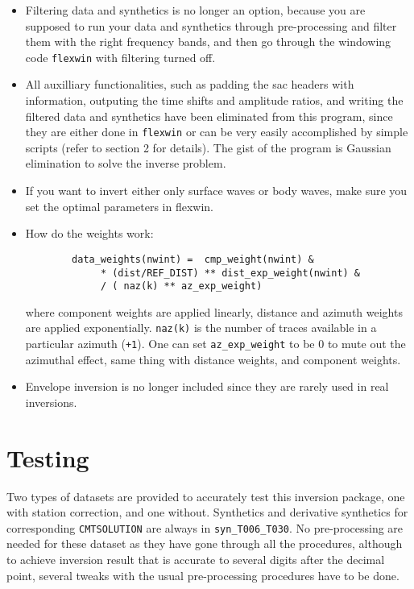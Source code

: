 \documentclass[12pt,titlepage,fleqn]{article}
\begin{document}
\begin{itemize}
\item  Filtering data and synthetics is no longer an option, because you are supposed to run your data and synthetics through pre-processing  and filter them with the right frequency bands, and then go through the windowing code \verb=flexwin= with filtering turned off.

\item All auxilliary functionalities, such as padding the sac headers with information, outputing the time shifts and amplitude ratios, and writing the filtered data and synthetics have been eliminated from this program, since they are either done in \verb=flexwin= or can be very easily accomplished by simple scripts (refer to section 2 for details). The gist of the program is Gaussian elimination to solve the inverse problem.

\item If you want to invert either only surface waves or body waves, make sure you set the optimal parameters in flexwin.

\item How do the weights work:

\begin{verbatim}
        data_weights(nwint) =  cmp_weight(nwint) &
             * (dist/REF_DIST) ** dist_exp_weight(nwint) &
             / ( naz(k) ** az_exp_weight)
\end{verbatim}
 where component weights are applied linearly, distance and azimuth weights are applied exponentially. \verb=naz(k)= is the number of traces available in a particular azimuth (\verb=+1=). One can set \verb=az_exp_weight= to be 0 to mute out the azimuthal effect, same thing with distance weights, and component weights.

\item Envelope inversion is no longer included since they are rarely used in real inversions.

\end{itemize}


\section{Testing}

Two types of datasets are provided to accurately test this inversion package, one with station correction, and one without. Synthetics and derivative synthetics for corresponding \verb=CMTSOLUTION= are always in \verb=syn_T006_T030=. No pre-processing are needed for these dataset as they have gone through all the procedures, although to achieve inversion result that is accurate to several digits after the decimal point, several tweaks with the usual pre-processing procedures have to be done.
\end{document}
